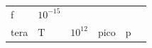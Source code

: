{\begin{tabular}[t]{|l|l|l|l|l|l|}
    
        f &
    
    
        
                \begin{math}{10}^{-15}\end{math}
     \tabularnewline\cline{1-1}\cline{2-2}\cline{3-3}\cline{4-4}\cline{5-5}\cline{6-6}
    
    
        tera &
    
    
        T &
    
    
        
                \begin{math}{10}^{12}\end{math}
               &
    
    
        pico &
    
    
        p &
    
    
        

\end{tabular}}
